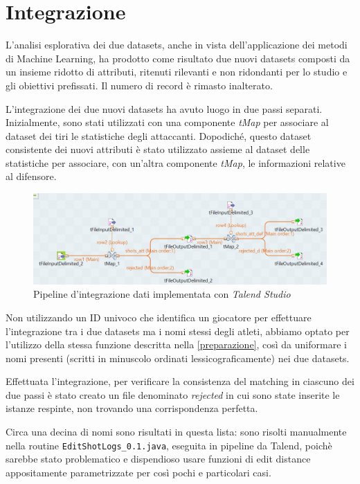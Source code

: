 \section{Integrazione}
\label{integrazione}

L'analisi esplorativa dei due datasets, anche in vista dell'applicazione dei metodi di Machine Learning, ha prodotto come risultato due nuovi datasets composti da un insieme ridotto di attributi, ritenuti rilevanti e non ridondanti per lo studio e gli obiettivi prefissati. Il numero di record è rimasto inalterato.
\par
L'integrazione dei due nuovi datasets ha avuto luogo in due passi separati. Inizialmente, sono stati utilizzati con una componente \textit{tMap} per associare al dataset dei tiri le statistiche degli attaccanti. Dopodiché, questo dataset consistente dei nuovi attributi è stato utilizzato assieme al dataset delle statistiche per associare, con un'altra componente \textit{tMap}, le informazioni relative al difensore.
\par
\begin{figure}[H]
\caption{Pipeline d'integrazione dati implementata con \textit{Talend Studio}}
	\includegraphics[width=\linewidth]{pipeline_talend1.png}
\end{figure}

Non utilizzando un ID univoco che identifica un giocatore per effettuare l'integrazione tra i due datasets ma i nomi stessi degli atleti, abbiamo optato per l'utilizzo della stessa funzione descritta nella \autoref{preparazione}, così da uniformare i nomi presenti (scritti in minuscolo ordinati lessicograficamente) nei due datasets. 
\par

Effettuata l'integrazione, per verificare la consistenza del matching in ciascuno dei due passi è stato creato un file denominato \textit{rejected} in cui sono state inserite le istanze respinte, non trovando una corrispondenza perfetta.
\par
Circa una decina di nomi sono risultati in questa lista: sono risolti manualmente nella routine \texttt{EditShotLogs\_0.1.java}, eseguita in pipeline da Talend, poichè sarebbe stato problematico e dispendioso usare funzioni di edit distance appositamente parametrizzate per così pochi e particolari casi.

